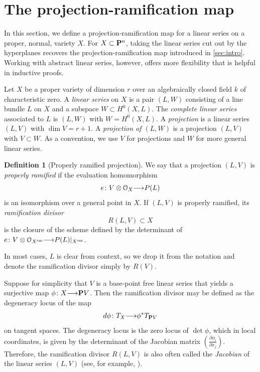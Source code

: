 \documentclass[11pt,reqno]{amsart}
\theoremstyle{plain}
\theoremstyle{definition}
\newtheorem{definition}[theorem]{Definition}
\theoremstyle{remark}
\numberwithin{equation}{section}
\renewcommand{\to}{{\longrightarrow}}
\numberwithin{equation}{section}
\renewcommand{\O}{\mathcal O}
\begin{document}
\section{The projection-ramification map}\label{sec:prmap}
In this section, we define a projection-ramification map for a linear series on a proper, normal, variety $X$.
For $X \subset \P^n$, taking the linear series cut out by the hyperplanes recovers the projection-ramification map introduced in \autoref{sec:intro}.
Working with abstract linear series, however, offers more flexibility that is helpful in inductive proofs.

Let $X$ be a proper variety of dimension $r$ over an algebraically closed field $k$ of characteristic zero.
A \emph{linear series} on $X$ is a pair $(L, W)$ consisting of a line bundle $L$ on $X$ and a subspace $W \subset H^0(X, L)$.
The \emph{complete linear series} associated to $L$ is $(L, W)$ with $W = H^0(X, L)$.
A \emph{projection} is a linear series $(L, V)$ with $\dim V = r+1$.
A \emph{projection of $(L, W)$} is a projection $(L, V)$ with $V \subset W$.
As a convention, we use $V$ for projections and $W$ for more general linear series.

\begin{definition}[Properly ramified projection]
  \label{def:properlyramified}
We say that a projection $(L,V)$ is \emph{properly ramified} if the evaluation homomorphism
\[e \from V \otimes \O_{X} \to P(L)\]
is an isomorphism over a general point in $X$.  If $(L,V)$ is properly ramified, its \emph{ramification divisor}
\[R(L,V) \subset X\]
is the closure of the scheme defined by the determinant of $e \from V \otimes \O_{X^{\rm sm}} \to P(L)|_{X^{\rm sm}}$.
\end{definition}
In most cases, $L$ is clear from context, so we drop it from the notation and denote the ramification divisor simply by $R(V)$.
\begin{remark}\label{rem:Jacobian}
  Suppose for simplicity that $V$ is a base-point free linear series that yields a surjective map $\phi \from X \to \P V$.
  Then the ramification divisor may be defined as the degeneracy locus of the map
  \[ d \phi \from T_{X} \to \phi^* T_{\P V}\]
  on tangent spaces.
  The degeneracy locus is the zero locus of $\det \phi$, which in local coordinates, is given by the determinant of the Jacobian matrix $\left( \frac{\partial \phi_i}{\partial x_j} \right)$.
  Therefore, the ramification divisor $R(L, V)$ is also often called the \emph{Jacobian} of the linear series $(L, V)$ (see, for example, \cite[1.1.7]{dol:12}).
\end{remark}
\end{document}
